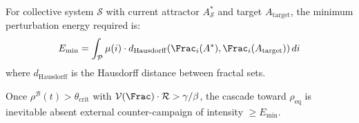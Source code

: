 \begin{theorem}
\label{thm:attractor-shift}
For collective system $\mathcal{S}$ with current attractor $A_{\mathcal{S}}^*$ and target $A_{\mathrm{target}}$, the minimum perturbation energy required is:
\[
    E_{\mathrm{min}} = \int_{\mathcal{P}} \mu(i) \cdot d_{\mathrm{Hausdorff}}(\Frac_i(A^*), \Frac_i(A_{\mathrm{target}})) \, di
\]
where $d_{\mathrm{Hausdorff}}$ is the Hausdorff distance between fractal sets.
\end{theorem}

\begin{corollary}
\label{cor:cascade-inevitable}
Once $\rho^{\mathcal{B}}(t) > \theta_{\mathrm{crit}}$ with $\mathcal{V}(\Frac) \cdot \mathcal{R} > \gamma/\beta$, the cascade toward $\rho_{\mathrm{eq}}$ is inevitable absent external counter-campaign of intensity $\geq E_{\mathrm{min}}$.
\end{corollary}

